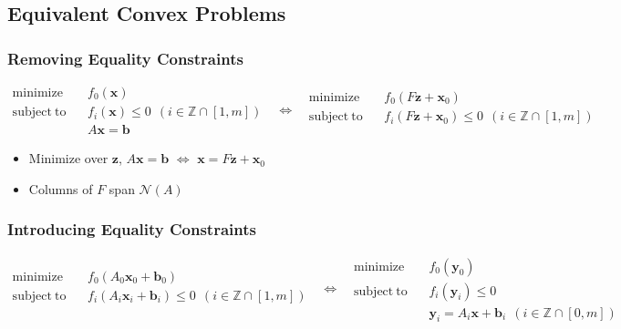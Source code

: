 \subsection{Equivalent Convex Problems}

\subsubsection*{Removing Equality Constraints}
$$ \begin{aligned}
    \mathrm{minimize}~~&~~f_0(\mathbf{x}) \\
    \mathrm{subject~to}~~&~~f_i(\mathbf{x}) \leq 0~~(i \in \mathbb{Z} \cap [1,m])\\
        &~~A\mathbf{x} = \mathbf{b}
\end{aligned}~~~\Leftrightarrow~~~\begin{aligned}
    \mathrm{minimize}~~&~~f_0(F\mathbf{z} + \mathbf{x}_0) \\
    \mathrm{subject~to}~~&~~f_i(F\mathbf{z} + \mathbf{x}_0) \leq 0~~(i \in \mathbb{Z} \cap [1,m]) \\ {}
\end{aligned} $$
\begin{itemize}
    \item Minimize over $\mathbf{z}$, $A\mathbf{x} = \mathbf{b}$ $\Leftrightarrow$ $\mathbf{x} = F\mathbf{z} + \mathbf{x}_0$
    \item Columns of $F$ span $\mathcal{N}(A)$
\end{itemize}

\subsubsection*{Introducing Equality Constraints}
$$ \begin{aligned}
    \mathrm{minimize}~~&~~f_0(A_0\mathbf{x}_0 + \mathbf{b}_0) \\
    \mathrm{subject~to}~~&~~f_i(A_i\mathbf{x}_i + \mathbf{b}_i) \leq 0~~(i \in \mathbb{Z} \cap [1,m]) \\ {}
\end{aligned}~~~\Leftrightarrow~~~\begin{aligned}
    \mathrm{minimize}~~&~~f_0(\mathbf{y}_0) \\
    \mathrm{subject~to}~~&~~f_i(\mathbf{y}_i) \leq 0 \\
        &~~\mathbf{y}_i = A_i \mathbf{x} + \mathbf{b}_i~~(i \in \mathbb{Z} \cap [0,m])
\end{aligned} $$

